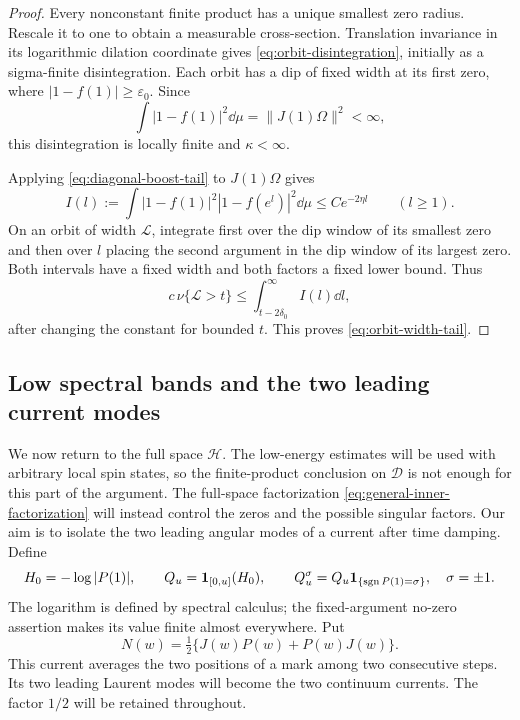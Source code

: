 \begin{proof}
Every nonconstant finite product has a unique smallest zero radius.
Rescale it to one to obtain a measurable cross-section.  Translation
invariance in its logarithmic dilation coordinate gives
\eqref{eq:orbit-disintegration}, initially as a sigma-finite
disintegration.  Each orbit has a dip of fixed width at its first zero,
where $|1-f(1)|\ge\varepsilon_0$.  Since
\[
 \int |1-f(1)|^2\dd\mu=\|J(1)\Omega\|^2<\infty,
\]
this disintegration is locally finite and $\kappa<\infty$.

Applying \eqref{eq:diagonal-boost-tail} to $J(1)\Omega$ gives
\begin{equation}\label{eq:two-dip-bound}
 I(l):=\int |1-f(1)|^2|1-f(e^l)|^2\dd\mu
 \le Ce^{-2\eta l}\qquad(l\ge1).
\end{equation}
On an orbit of width $\mathcal L$, integrate first over the dip window
of its smallest zero and then over $l$ placing the second argument in
the dip window of its largest zero.  Both intervals have a fixed width
and both factors a fixed lower bound.  Thus
\[
 c\,\nu\{\mathcal L>t\}
 \le \int_{t-2\delta_0}^{\infty} I(l)\dd l,
\]
after changing the constant for bounded $t$.  This proves
\eqref{eq:orbit-width-tail}.
\end{proof}

\subsection{Low spectral bands and the two leading current modes}

We now return to the full space $\mathcal H$. The low-energy estimates
will be used with arbitrary local spin states, so the finite-product
conclusion on $\mathcal D$ is not enough for this part of the argument.
The full-space factorization \eqref{eq:general-inner-factorization}
will instead control the zeros and the possible singular factors.
Our aim is to isolate the two leading angular modes of a current after
time damping. Define
\[
 H_0=-\log|P(1)|,\qquad Q_u=\mathbf1_{[0,u]}(H_0),\qquad
 Q_u^\sigma=Q_u\mathbf1_{\{\operatorname{sgn} P(1)=\sigma\}},\quad \sigma=\pm1.
\]
The logarithm is defined by spectral calculus; the fixed-argument
no-zero assertion makes its value finite almost everywhere.  Put
\begin{equation}\label{eq:angular-N-definition}
 N(w)=\tfrac12\{J(w)P(w)+P(w)J(w)\}.
\end{equation}
This current averages the two positions of a mark among two consecutive
steps. Its two leading Laurent modes will become the two continuum
currents. The factor $1/2$ will be retained throughout.

